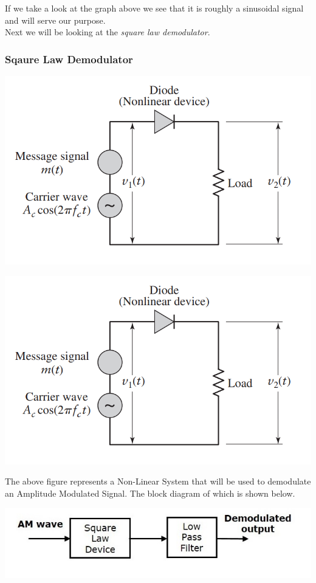 \documentclass[12pt,a4paper]{article}%
\begin{document}
\begin{flushleft}
\begin{flushleft}
\begin{flushleft}
\begin{center}
				\end{center}
				If we take a look at the graph above we see that it is roughly a sinusoidal signal and will serve our purpose.\\
				Next we will be looking at the \textit{square law demodulator}.
				
			\end{flushleft}
			\subsubsection{Sqaure Law Demodulator}
			\begin{flushleft}
				\begin{center}
					\includegraphics[width=0.60 \textwidth]{./images/Non Linear System.png}
				\end{center}
				\begin{center}
					\includegraphics[width=0.60 \textwidth]{./images/Non Linear System.png}
				\end{center}
				The above figure represents a Non-Linear System that will be used to demodulate an Amplitude Modulated Signal. The block diagram of which is shown below.
				\begin{center}
					\includegraphics[width=0.60 \textwidth]{./images/Block Diagram of square law demodulator.png}
				\end{center}

\end{flushleft}
\end{flushleft}
\end{flushleft}
\end{document}
